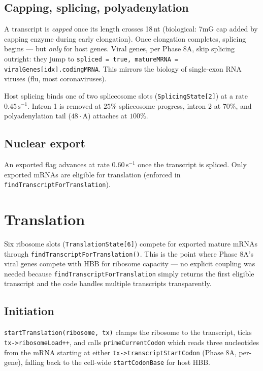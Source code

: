 \documentclass[11pt,letterpaper,twoside,openany]{book}
\newcommand{\code}[1]{\texttt{#1}}
\begin{document}
\section{Capping, splicing, polyadenylation}

A transcript is \emph{capped} once its length crosses 18\,nt
(biological: 7mG cap added by capping enzyme during early
elongation). Once elongation completes, splicing begins --- but
\emph{only} for host genes. Viral genes, per Phase 8A, skip splicing
outright: they jump to \code{spliced = true, matureMRNA =
viralGenes[idx].codingMRNA}. This mirrors the biology of
single-exon RNA viruses (flu, most coronaviruses).

Host splicing binds one of two spliceosome slots
(\code{SplicingState[2]}) at a rate $0.45\,\text{s}^{-1}$. Intron 1
is removed at $25\%$ spliceosome progress, intron 2 at $70\%$, and
polyadenylation tail ($48 \cdot \text{A}$) attaches at $100\%$.

\section{Nuclear export}

An exported flag advances at rate $0.60\,\text{s}^{-1}$ once the
transcript is spliced. Only exported mRNAs are eligible for
translation (enforced in \code{findTranscriptForTranslation}).

\chapter{Translation}
\label{ch:translation}

Six ribosome slots (\code{TranslationState[6]}) compete for exported
mature mRNAs through \code{findTranscriptForTranslation()}. This is
the point where Phase 8A's viral genes compete with HBB for
ribosome capacity --- no explicit coupling was needed because
\code{findTranscriptForTranslation} simply returns the first eligible
transcript and the code handles multiple transcripts transparently.

\section{Initiation}

\code{startTranslation(ribosome, tx)} clamps the ribosome to the
transcript, ticks \code{tx->ribosomeLoad++}, and calls
\code{primeCurrentCodon} which reads three nucleotides from the
mRNA starting at either \code{tx->transcriptStartCodon} (Phase 8A,
per-gene), falling back to the cell-wide \code{startCodonBase} for
host HBB.
\end{document}
